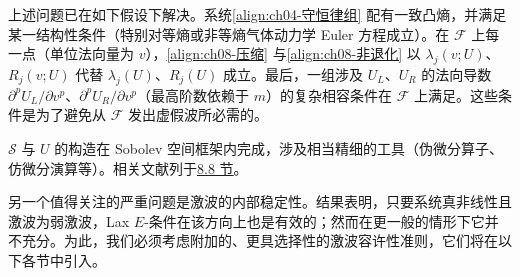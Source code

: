 \documentclass[../../main.tex]{subfiles}
\begin{document}
上述问题已在如下假设下解决。系统\eqref{align:ch04-守恒律组} 配有一致凸熵，并满足某一结构性条件（特别对等熵或非等熵气体动力学 Euler 方程成立）。在 $\mathscr F$ 上每一点（单位法向量为 $v$），\eqref{align:ch08-压缩} 与\eqref{align:ch08-非退化} 以 $\lambda_j(v;U)$、$R_j(v;U)$ 代替 $\lambda_j(U)$、$R_j(U)$ 成立。最后，一组涉及 $U_L$、$U_R$ 的法向导数 $\partial^p U_L/\partial v^p$、$\partial^p U_R/\partial v^p$（最高阶数依赖于 $m$）的复杂相容条件在 $\mathscr F$ 上满足。这些条件是为了避免从 $\mathscr F$ 发出虚假波所必需的。

$\mathscr S$ 与 $U$ 的构造在 Sobolev 空间框架内完成，涉及相当精细的工具（伪微分算子、仿微分演算等）。相关文献列于\hyperref[section:ch08-注记]{8.8 节}。

另一个值得关注的严重问题是激波的内部稳定性。结果表明，只要系统真非线性且激波为弱激波，Lax $E$-条件在该方向上也是有效的；然而在更一般的情形下它并不充分。为此，我们必须考虑附加的、更具选择性的激波容许性准则，它们将在以下各节中引入。
\end{document}
